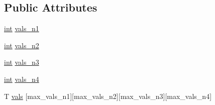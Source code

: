 \subsection*{Public Attributes}
\begin{DoxyCompactItemize}
\item 
\hyperlink{classint}{int} \hyperlink{structutils_1_1vals__table__4d_afec88fbd769ce98aad5e14d16ab948fc}{vals\-\_\-n1}
\item 
\hyperlink{classint}{int} \hyperlink{structutils_1_1vals__table__4d_a485b4f6f987c51d68d9f1010185a7a41}{vals\-\_\-n2}
\item 
\hyperlink{classint}{int} \hyperlink{structutils_1_1vals__table__4d_a605d04c0b9ec8b6ee58bd8112555bfa0}{vals\-\_\-n3}
\item 
\hyperlink{classint}{int} \hyperlink{structutils_1_1vals__table__4d_ac6d1e996ac8b995f53741fa7fef39471}{vals\-\_\-n4}
\item 
T \hyperlink{structutils_1_1vals__table__4d_a735266a1f587c1c6a065a9a52bcb0502}{vals} \mbox{[}max\-\_\-vals\-\_\-n1\mbox{]}\mbox{[}max\-\_\-vals\-\_\-n2\mbox{]}\mbox{[}max\-\_\-vals\-\_\-n3\mbox{]}\mbox{[}max\-\_\-vals\-\_\-n4\mbox{]}
\end{DoxyCompactItemize}


